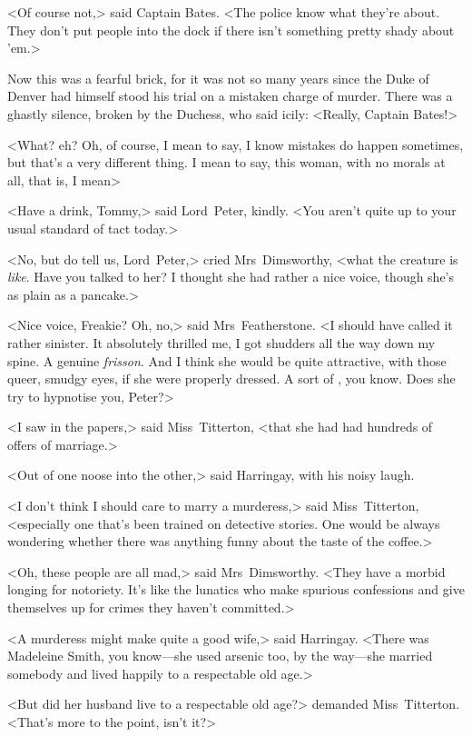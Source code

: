 <Of course not,> said Captain Bates. <The police know what they're about. They don't put people into the dock if there isn't something pretty shady about 'em.>

Now this was a fearful brick, for it was not so many years since the Duke of Denver had himself stood his trial on a mistaken charge of murder. There was a ghastly silence, broken by the Duchess, who said icily: <Really, Captain Bates!>

<What? eh? Oh, of course, I mean to say, I know mistakes do happen sometimes, but that's a very different thing. I mean to say, this woman, with no morals at all, that is, I mean\longdash>

<Have a drink, Tommy,> said Lord~Peter, kindly. <You aren't quite up to your usual standard of tact today.>

<No, but do tell us, Lord~Peter,> cried Mrs~Dimsworthy, <what the creature is \emph{like}. Have you talked to her? I thought she had rather a nice voice, though she's as plain as a pancake.>

<Nice voice, Freakie? Oh, no,> said Mrs~Featherstone. <I should have called it rather sinister. It absolutely thrilled me, I got shudders all the way down my spine. A genuine \emph{frisson}. And I think she would be quite attractive, with those queer, smudgy eyes, if she were properly dressed. A sort of , you know. Does she try to hypnotise you, Peter?>

<I saw in the papers,> said Miss~Titterton, <that she had had hundreds of offers of marriage.>

<Out of one noose into the other,> said Harringay, with his noisy laugh.

<I don't think I should care to marry a murderess,> said Miss~Titterton, <especially one that's been trained on detective stories. One would be always wondering whether there was anything funny about the taste of the coffee.>

<Oh, these people are all mad,> said Mrs~Dimsworthy. <They have a morbid longing for notoriety. It's like the lunatics who make spurious confessions and give themselves up for crimes they haven't committed.>

<A murderess might make quite a good wife,> said Harringay. <There was Madeleine Smith, you know—she used arsenic too, by the way—she married somebody and lived happily to a respectable old age.>

<But did her husband live to a respectable old age?> demanded Miss~Titterton. <That's more to the point, isn't it?>

